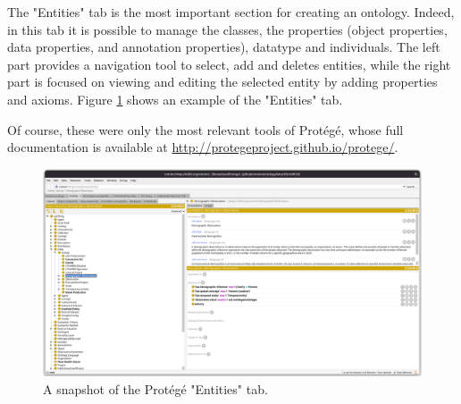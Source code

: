 The "Entities" tab is the most important section for creating an ontology. Indeed, in this tab it is possible to manage the classes, the properties (object properties, data properties, and annotation properties), datatype and individuals. The left part provides a navigation tool to select, add and deletes entities, while the right part is focused on viewing and editing the selected entity by adding properties and axioms. Figure \ref{fig:protege-entities} shows an example of the "Entities" tab.

Of course, these were only the most relevant tools of Protégé, whose full documentation is available at \url{http://protegeproject.github.io/protege/}.

\begin{figure}[!ht]
  \centering
  \includegraphics[width=\columnwidth]{images/protege/protege-entities}
  \caption{A snapshot of the Protégé "Entities" tab.}
  \label{fig:protege-entities}
\end{figure}